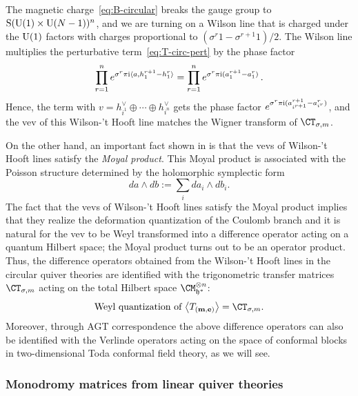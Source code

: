The magnetic charge~\eqref{eq:B-circular} breaks the gauge group to
$\mathrm{S}(\mathrm{U}(1) \times \mathrm{U}(N-1))^n$, and we are turning on a Wilson
line that is charged under the $\mathrm{U}(1)$ factors with charges
proportional to $(\sigma^r 1 - \sigma^{r+1} 1)/2$.  The Wilson line
multiplies the perturbative term~\eqref{eq:T-circ-pert} by the phase
factor
\begin{equation}
  \prod_{r=1}^n e^{\sigma^r \pi\mathrm{i} \langle a, h^{r+1}_1 - h^r_1\rangle}
  =
  \prod_{r=1}^n e^{\sigma^r \pi\mathrm{i} (a^{r+1}_1 - a^r_1)} \,.
\end{equation}
Hence, the term with $v = h^\vee_{i^1} \oplus \dotsb \oplus h^\vee_{i^n}$ gets
the phase factor
$e^{\sigma^r \pi\mathrm{i} (a^{r+1}_{i^{r+1}} - a^r_{i^r})}$, and the vev of
this Wilson-'t Hooft line matches the Wigner transform of
$\CT_{\sigma,m}$.


On the other hand,
an important fact shown in \cite{Ito:2011ea} is that the vevs of Wilson-'t Hooft
lines satisfy the \emph{Moyal product}.
This Moyal product is
associated with the Poisson structure determined by the holomorphic
symplectic form
\begin{equation}
  da\wedge db:=\sum_{i}da_{i}\wedge db_{i}.
\end{equation}
The fact that the vevs of Wilson-'t Hooft lines satisfy the Moyal product
implies that they realize the deformation quantization of the Coulomb
branch and it is natural for the vev to be Weyl
transformed into a difference operator acting on a quantum Hilbert space;
the Moyal product turns out to be an operator product.
Thus, the difference
operators obtained from the Wilson-'t Hooft lines in the circular quiver theories are
identified with the trigonometric transfer matrices $\CT_{\sigma,m}$ acting on the total
Hilbert space $\CM_{\hf^*}^{\otimes n}$:
\begin{equation}
  \text{Weyl quantization of } \bigvev{T_{(\mcharge,\echarge)}}
    = \CT_{\sigma,m}.
\label{eq:WT_CT}
\end{equation}
Moreover, through
AGT correspondence the above difference operators can also be identified
with the Verlinde operators acting on the space of conformal blocks
in two-dimensional Toda conformal field theory, as we will see.





\subsubsection{Monodromy matrices from linear quiver theories}

